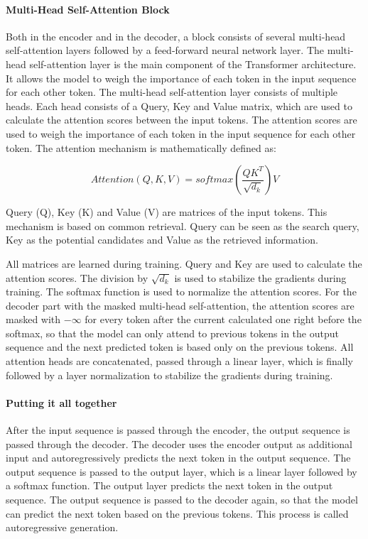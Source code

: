 \paragraph{Multi-Head Self-Attention Block}

Both in the encoder and in the decoder, a block consists of several multi-head self-attention layers followed by a feed-forward neural network layer. The multi-head self-attention layer is the main component of the Transformer architecture. It allows the model to weigh the importance of each token in the input sequence for each other token. The multi-head self-attention layer consists of multiple heads. Each head consists of a Query, Key and Value matrix, which are used to calculate the attention scores between the input tokens. The attention scores are used to weigh the importance of each token in the input sequence for each other token. The attention mechanism is mathematically defined as:

$$Attention(Q,K, V) = softmax(\frac{QK^T}{\sqrt{d_k}})V$$

Query (Q), Key (K) and Value (V) are matrices of the input tokens. This mechanism is based on common retrieval. Query can be seen as the search query, Key as the potential candidates and Value as the retrieved information.

All matrices are learned during training. Query and Key are used to calculate the attention scores. The division by $\sqrt{d_k}$ is used to stabilize the gradients during training. The softmax function is used to normalize the attention scores. For the decoder part with the masked multi-head self-attention, the attention scores are masked with $-\infty$ for every token after the current calculated one right before the softmax, so that the model can only attend to previous tokens in the output sequence and the next predicted token is based only on the previous tokens. All attention heads are concatenated, passed through a linear layer, which is finally followed by a layer normalization to stabilize the gradients during training. 

\paragraph{Putting it all together}
After the input sequence is passed through the encoder, the output sequence is passed through the decoder. The decoder uses the encoder output as additional input and autoregressively predicts the next token in the output sequence. The output sequence is passed to the output layer, which is a linear layer followed by a softmax function. The output layer predicts the next token in the output sequence. The output sequence is passed to the decoder again, so that the model can predict the next token based on the previous tokens. This process is called autoregressive generation.

